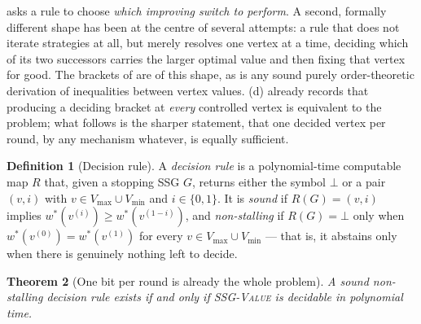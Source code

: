\documentclass[11pt]{article}
\theoremstyle{plain}
\newtheorem{theorem}{Theorem}[section]
\theoremstyle{definition}
\newtheorem{definition}[theorem]{Definition}
\newcommand{\Vmax}{V_{\max}}
\newcommand{\Vmin}{V_{\min}}
\begin{document}
\medskip

 asks a rule to choose \emph{which improving switch to
perform}. A second, formally different shape has been at the centre of
several attempts: a rule that does not iterate strategies at all, but
merely resolves one vertex at a time, deciding which of its two
successors carries the larger optimal value and then fixing that vertex
for good. The brackets of  are of this shape, as is any
sound purely order-theoretic derivation of inequalities between vertex
values. (d) already records that producing a deciding
bracket at \emph{every} controlled vertex is equivalent to the problem;
what follows is the sharper statement, that one decided vertex per round,
by any mechanism whatever, is equally sufficient.

\begin{definition}[Decision rule]\label{def:decision-rule}
A \emph{decision rule} is a polynomial-time computable map $R$ that,
given a stopping SSG $G$, returns either the symbol $\bot$ or a pair
$(v,i)$ with $v\in\Vmax\cup\Vmin$ and $i\in\{0,1\}$. It is \emph{sound}
if $R(G)=(v,i)$ implies $w^\ast(v^{(i)})\ge w^\ast(v^{(1-i)})$, and
\emph{non-stalling} if $R(G)=\bot$ only when
$w^\ast(v^{(0)})=w^\ast(v^{(1)})$ for every $v\in\Vmax\cup\Vmin$ ---
that is, it abstains only when there is genuinely nothing left to decide.
\end{definition}

\begin{theorem}[One bit per round is already the whole problem]\label{thm:decide-one-bit}
A sound non-stalling decision rule exists if and only if
\textsc{SSG-Value} is decidable in polynomial time.
\end{theorem}
\end{document}
